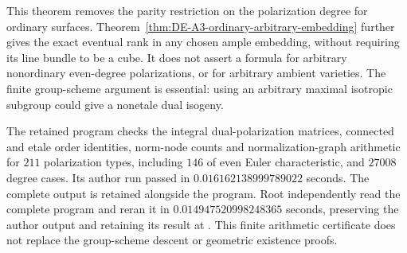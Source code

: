 \begin{remark}
\label{rem:DE-A3-ordinary-all-rank-scope}
This theorem removes the parity restriction on the polarization degree
for ordinary surfaces.  Theorem~\ref{thm:DE-A3-ordinary-arbitrary-embedding}
further gives the exact eventual rank in any chosen ample embedding,
without requiring its line bundle to be a cube.  It does not assert a formula for arbitrary
nonordinary even-degree polarizations, or for arbitrary ambient varieties.
The finite group-scheme argument is essential: using an arbitrary
maximal isotropic subgroup could give a nonetale dual isogeny.

The retained program
checks the integral dual-polarization matrices, connected and etale
order identities, norm-node counts and normalization-graph arithmetic
for $211$ polarization types, including $146$ of even Euler
characteristic, and $27008$ degree cases.  Its author run passed in
$0.016162138999789022$ seconds.  The complete output is retained
alongside the program.  Root independently read the complete program
and reran it in $0.014947520998248365$ seconds, preserving the author
output and retaining its result at
.
This finite arithmetic certificate does not
replace the group-scheme descent or geometric existence proofs.
\end{remark}
